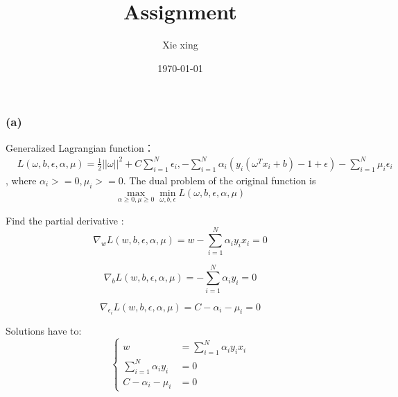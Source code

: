 \documentclass[oneside,solution]{seu-ml-assign}
\title{Assignment}
\author{Xie xing}
\date{\today}
\begin{document}
\maketitle


\subsection{}


\subsubsection{(a)}
Generalized Lagrangian function：
\begin{equation}\begin{aligned}       & L(\omega,b,\epsilon,\alpha,\mu)=\frac12||\omega||^2+C\sum_{i=1}^N\epsilon_i,-\sum_{i=1}^N
                     \alpha_i(y_i(\omega^Tx_i+b) -1 + \epsilon)-\sum_{i=1}^N\mu_i\epsilon_i\end{aligned}
\end{equation},
where $ \alpha_i >= 0, \mu_i >=0$.
The dual problem of the original function is
\begin{equation}\max_{\alpha\geq0,\mu\geq0}\min_{\omega,b,\epsilon}L(\omega,b,\epsilon,\alpha,\mu)\end{equation}

Find the partial derivative :
\begin{equation}
  \nabla_{w}L(w,b,\epsilon,\alpha,\mu)=w-\sum_{i=1}^{N}\alpha_{i}y_{i}x_{i}=0
\end{equation}

\begin{equation}
  \nabla_{b}L(w,b,\epsilon,\alpha,\mu)=-\sum_{i=1}^{N}\alpha_{i}y_{i}=0
\end{equation}

\begin{equation}
  \nabla_{\epsilon_{i}}L(w,b,\epsilon,\alpha,\mu)=C-\alpha_{i}-\mu_{i}=0
\end{equation}

Solutions have to:
\begin{equation}\left.\left\{\begin{aligned}w                       & =\sum_{i=1}^N\alpha_iy_ix_i \\
               \sum_{i=1}^N\alpha_iy_i & =0                          \\
               C-\alpha_i-\mu_i        & =0\end{aligned}\right.\right.
\end{equation}
\end{document}
